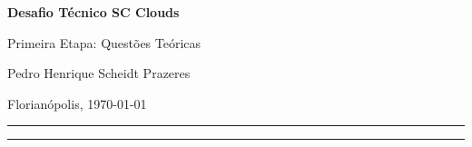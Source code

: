 \documentclass[11pt,a4paper]{article}
\begin{document}
\frenchspacing

\begin{center}
  {\sffamily\LARGE\bfseries Desafio Técnico SC Clouds\par}
  \vspace{0.4em}
  {\sffamily\large Primeira Etapa: Questões Teóricas\par}
  \vspace{0.9em}
  {\normalsize Pedro Henrique Scheidt Prazeres\par}
  {\footnotesize Florianópolis, \today\par}
\end{center}
\vspace{0.6em}
{\color{cRule}\rule{\linewidth}{0.8pt}}

\vspace{0.4em}
{\hypersetup{linkcolor=black}\tableofcontents}
\vspace{0.4em}
{\color{cRule}\rule{\linewidth}{0.4pt}}
\vspace{0.4em}





\printbibliography[heading=bibintoc,title={Referências}]
\end{document}
